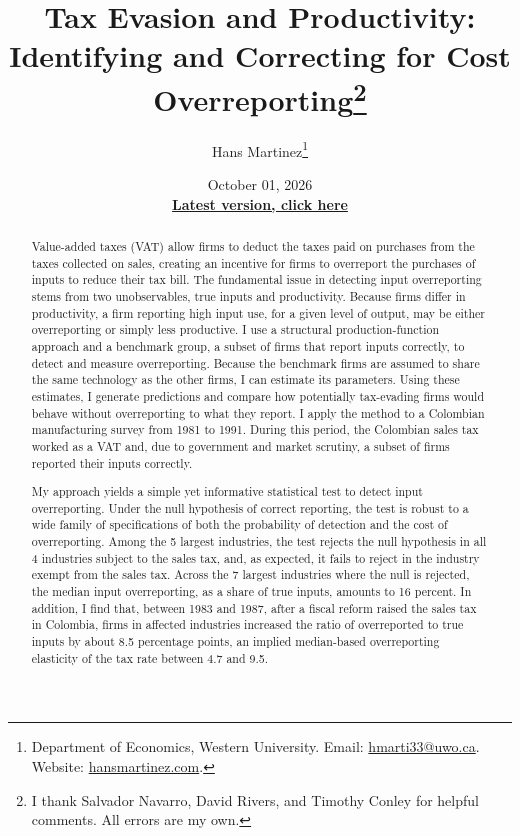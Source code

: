 \documentclass[
  12pt]{article}
\title{Tax Evasion and Productivity: Identifying and Correcting for Cost
Overreporting\thanks{I thank Salvador Navarro, David Rivers, and Timothy
Conley for helpful comments. All errors are my own.}}
\author{Hans Martinez\thanks{Department of Economics, Western
University. Email: \href{mailto:hmarti33@uwo.ca}{hmarti33@uwo.ca}. Website: \href{https://hansmartinez.com}{hansmartinez.com}.}}
\date{October 01,
2026\\[0.5em]\href{https://hansmartinez.com/project/tax\_prod/}{\small\textbf{Latest version, click here}}}
\begin{document}
\maketitle
\begin{abstract}
Value-added taxes (VAT) allow firms to deduct the taxes paid on
purchases from the taxes collected on sales, creating an incentive for
firms to overreport the purchases of inputs to reduce their tax bill.
The fundamental issue in detecting input overreporting stems from two
unobservables, true inputs and productivity. Because firms differ in
productivity, a firm reporting high input use, for a given level of
output, may be either overreporting or simply less productive. I use a
structural production-function approach and a benchmark group, a subset
of firms that report inputs correctly, to detect and measure
overreporting. Because the benchmark firms are assumed to share the same
technology as the other firms, I can estimate its parameters. Using
these estimates, I generate predictions and compare how potentially
tax-evading firms would behave without overreporting to what they
report. I apply the method to a Colombian manufacturing survey from 1981
to 1991. During this period, the Colombian sales tax worked as a VAT
and, due to government and market scrutiny, a subset of firms reported
their inputs correctly.

My approach yields a simple yet informative statistical test to detect
input overreporting. Under the null hypothesis of correct reporting, the
test is robust to a wide family of specifications of both the
probability of detection and the cost of overreporting. Among the 5
largest industries, the test rejects the null hypothesis in all 4
industries subject to the sales tax, and, as expected, it fails to
reject in the industry exempt from the sales tax. Across the 7 largest
industries where the null is rejected, the median input overreporting,
as a share of true inputs, amounts to 16 percent. In addition, I find
that, between 1983 and 1987, after a fiscal reform raised the sales tax
in Colombia, firms in affected industries increased the ratio of
overreported to true inputs by about 8.5 percentage points, an implied
median-based overreporting elasticity of the tax rate between 4.7 and
9.5.


\end{abstract}
\end{document}
